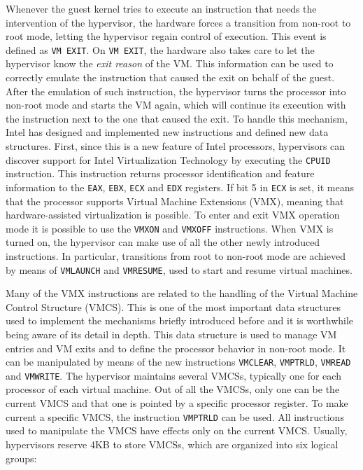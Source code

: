 \par
Whenever the guest kernel tries to execute an instruction that needs the intervention of the hypervisor, the hardware forces a transition from non-root to root mode, letting the hypervisor regain control of execution. This event is defined as \texttt{VM EXIT}. On \texttt{VM EXIT}, the hardware also takes care to let the hypervisor know the \emph{exit reason} of the VM. This information can be used to correctly emulate the instruction that caused the exit on behalf of the guest. After the emulation of such instruction, the hypervisor turns the processor into non-root mode and starts the VM again, which will continue its execution with the instruction next to the one that caused the exit. To handle this mechanism, Intel has designed and implemented new instructions and defined new data structures. First, since this is a new feature of Intel processors, hypervisors can discover support for Intel Virtualization Technology by executing the \texttt{CPUID} instruction. This instruction returns processor identification and feature information to the \texttt{EAX}, \texttt{EBX}, \texttt{ECX} and \texttt{EDX} registers. If bit 5 in \texttt{ECX} is set, it means that the processor supports Virtual Machine Extensions (VMX), meaning that hardware-assisted virtualization is possible. To enter and exit VMX operation mode it is possible to use the \texttt{VMXON} and \texttt{VMXOFF} instructions. When VMX is turned on, the hypervisor can make use of all the other newly introduced instructions. In particular, transitions from root to non-root mode are achieved by means of \texttt{VMLAUNCH} and \texttt{VMRESUME}, used to start and resume virtual machines.
\par
Many of the VMX instructions are related to the handling of the Virtual Machine Control Structure (VMCS). This is one of the most important data structures used to implement the mechanisms briefly introduced before and it is worthwhile being aware of its detail in depth. This data structure is used to manage VM entries and VM exits and to define the processor behavior in non-root mode. It can be manipulated by means of the new instructions \texttt{VMCLEAR}, \texttt{VMPTRLD}, \texttt{VMREAD} and  \texttt{VMWRITE}. The hypervisor maintains several VMCSs, typically one for each processor of each virtual machine. Out of all the VMCSs, only one can be the current VMCS and that one is pointed by a specific processor register. To make current a specific VMCS, the instruction \texttt{VMPTRLD} can be used. All instructions used to manipulate the VMCS have effects only on the current VMCS. Usually, hypervisors reserve 4KB to store VMCSs, which are organized into six logical groups:
